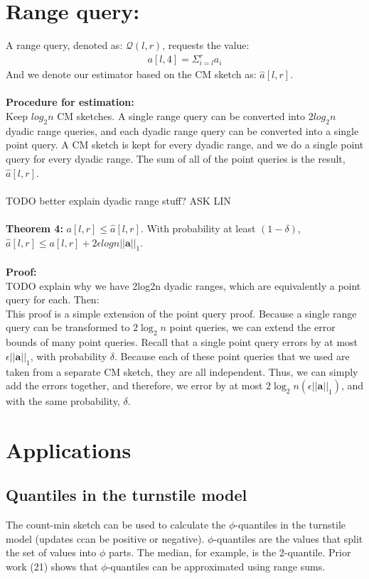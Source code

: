 \documentclass[11pt]{article}
\begin{document}
\section{Range query:}
A range query, denoted as: $\mathcal{Q}(l,r)$, requests the value:
\begin{align*}
    a[l,4] = \Sigma_{i=l}^r a_i
    \end{align*}
    And we denote our estimator based on the CM sketch as: $\hat a[l,r]$.\\\\
    \textbf{Procedure for estimation:}\\
    Keep $log_2n$ CM sketches. A single range query can be converted into $2log_2n$ dyadic range queries, and each dyadic range query can be converted into a single point query. A CM sketch is kept for every dyadic range, and we do a single point query for every dyadic range. The sum of all of the point queries is the result, $\hat a[l,r]$.\\\\
    TODO better explain dyadic range stuff? ASK LIN \\\\
    \textbf{Theorem 4: } $a[l,r] \leq \hat a[l,r]$. With probability at least $(1-\delta)$, $\hat a[l,r] \leq a[l,r] + 2\epsilon logn ||\bm{a}||_1$.\\\\
    \textbf{Proof:}\\
    TODO explain why we have 2log2n dyadic ranges, which are equivalently a point query for each. Then:\\
    This proof is a simple extension of the point query proof. Because a single range query can be transformed to $2\log_2n$ point queries, we can extend the error bounds of many point queries. Recall that a single point query errors by at most $\epsilon ||\bm{a}||_1$, with probability $\delta$. Because each of these point queries that we used are taken from a separate CM sketch, they are all independent. Thus, we can simply add the errors together, and therefore, we error by at most $2\log_2n(\epsilon||\bm{a}||_1)$, and with the same probability, $\delta$.

\section{Applications}

\subsection{Quantiles in the turnstile model}
The count-min sketch can be used to calculate the $\phi$-quantiles in the turnstile model (updates
ccan be positive or negative). $\phi$-quantiles are the values that split the set of values into
$\phi$ parts.  The median, for example, is the 2-quantile. Prior work (21) shows that
$\phi$-quantiles can be approximated using range sums. 
\end{document}
